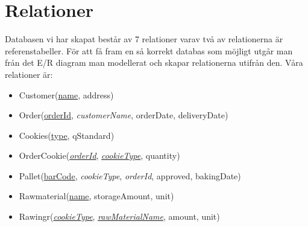 \section{Relationer}

Databasen vi har skapat består av 7 relationer varav två av relationerna är referenstabeller. För att få fram en så korrekt databas som möjligt utgår man från det E/R diagram man modellerat och skapar relationerna utifrån den. Våra relationer är:

\begin{itemize}
	
\item{Customer(\underline{name}, address)}
\item{Order(\underline{orderId}, \emph{customerName}, orderDate, deliveryDate)}
\item{Cookies(\underline{type}, qStandard)}
\item{OrderCookie(\underline{\emph{orderId}}, \underline{\emph{cookieType}}, quantity)}
\item{Pallet(\underline{barCode}, \emph{cookieType}, \emph{orderId}, approved, bakingDate)}
\item{Rawmaterial(\underline{name}, storageAmount, unit)}
\item{Rawingr(\underline{\emph{cookieType}}, \underline{\emph{rawMaterialName}}, amount, unit)}

\end{itemize}

